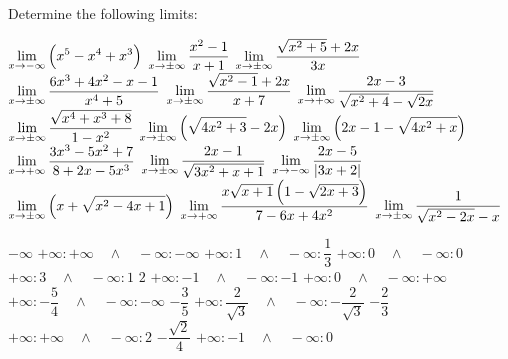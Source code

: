 \begin{Exercise} Determine the following limits:
\begin{multicols}{2}
        \ifcalculus
        \Question[difficulty = 1] $\displaystyle\lim_{x\rightarrow -\infty} \left(x^5-x^4+x^3\right)$
        \Question[difficulty = 1] $\displaystyle\lim_{x\rightarrow \pm\infty} \dfrac{x^2-1}{x+1}$
        \Question[difficulty = 1] $\displaystyle\lim_{x\rightarrow \pm\infty} \dfrac{\sqrt{x^2+5}+2x}{3x}$
        \fi
        \Question[difficulty = 1] $\displaystyle\lim_{x\rightarrow\pm\infty}\dfrac{6x^3+4x^2-x-1}{x^4+5}$
		\Question[difficulty = 1] $\displaystyle\lim_{x\rightarrow\pm\infty}\dfrac{\sqrt{x^2-1}+2x}{x+7}$
		\Question[difficulty = 1] $\displaystyle\lim_{x\rightarrow+\infty}\dfrac{2x-3}{\sqrt{x^2+4}-\sqrt{2x}}$
		\Question[difficulty = 1] $\displaystyle\lim_{x\rightarrow\pm\infty}\dfrac{\sqrt{x^4+x^3+8}}{1-x^2}$
		\ifanalysis\Question[difficulty = 1]\fi\ifcalculus\Question[difficulty = 2]\fi $\displaystyle\lim_{x\rightarrow\pm\infty}\left( \sqrt{4x^2+3}-2x\right)$
		\Question[difficulty = 2] $\displaystyle\lim_{x\rightarrow\pm\infty}\left(2x-1-\sqrt{4x^2+x}\right)$
    	\Question[difficulty = 1]  $\displaystyle\lim_{x\rightarrow +\infty} \dfrac{3x^3-5x^2+7}{8+2x-5x^3}$ 
    	\Question[difficulty = 1]  $\displaystyle\lim_{x\rightarrow \pm \infty} \dfrac{2x-1}{\sqrt{3x^2+x+1}}$ 
        \Question[difficulty = 1] $\displaystyle\lim_{x\rightarrow -\infty} \dfrac{2x-5}{|3x+2|}$ 
        \ifanalysis\Question[difficulty = 1]\fi\ifcalculus\Question[difficulty = 2]\fi $\displaystyle\lim_{x\rightarrow  \pm \infty} \left(x + \sqrt{x^2-4x+1}\right)$ 
        \ifanalysis
        	\Question[difficulty = 2]  $\displaystyle\lim_{x\rightarrow +\infty} \dfrac{x \sqrt{x+1}\left(1-\sqrt{2x+3} \right)}{7-6x+4x^2}$ 
            \Question[difficulty = 1]  $\displaystyle\lim_{x\rightarrow \pm \infty} \dfrac{1}{\sqrt{x^2-2x}-x}$ 
        \fi
        \EndCurrentQuestion
\end{multicols}

\end{Exercise}

\begin{Answer}\phantom{}
    \begin{multicols}{2} 
		
		    \ifcalculus
			\Question $-\infty$
			\Question $+\infty : +\infty\quad\wedge\quad -\infty : -\infty $
			\Question $+\infty : 1\quad\wedge\quad -\infty : \dfrac{1}{3} $
			\fi
		    \Question $+\infty : 0\quad\wedge\quad -\infty : 0 $
			\Question $+\infty : 3\quad\wedge\quad -\infty : 1 $
			\Question $2$
			\Question $+\infty : -1\quad\wedge\quad -\infty : -1$
			\Question $+\infty : 0\quad\wedge\quad -\infty : +\infty $
			\Question $+\infty : -\dfrac{5}{4}\quad\wedge\quad -\infty : -\infty $
    	    \Question $-\dfrac{3}{5}$ 
            \Question $+\infty: \dfrac{2}{\sqrt{3}}\quad\wedge\quad -\infty: -\dfrac{2}{\sqrt{3}}$
            \Question  $-\dfrac{2}{3}$
            \Question $+\infty: + \infty \quad\wedge\quad  -\infty: 2$	
           \ifanalysis
    	    \Question $-\dfrac{\sqrt{2}}{4}$
            \Question $ +\infty: -1 \quad\wedge\quad   -\infty: 0$
           \fi
		\EndCurrentQuestion
	\end{multicols}	
\end{Answer}



